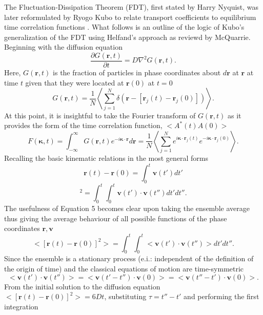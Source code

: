 \documentclass[aps,prb,preprint,preprintnumbers,amsmath,amssymb,floatfix,superscriptaddress]{revtex4}
\begin{document}
The Fluctuation-Dissipation Theorem (FDT), first stated by Harry Nyquist, was later reformulated by Ryogo Kubo to relate transport coefficients to equilibrium time correlation functions \cite{JPSJ.12.570}. What follows is an outline of the logic of Kubo's generalization of the FDT using Helfand's approach as reviewd by McQuarrie\cite{mcquarrie}. Beginning with the diffusion equation
%
\begin{equation}
\frac{\partial G(\pmb{r},t)}{\partial t}= D \nabla ^2G(\pmb{r},t).
\end{equation}
%
Here, $G(\pmb{r},t)$ is the fraction of particles in phase coordinates about $d\pmb{r}$ at $\pmb{r}$ at time $t$ given that they were located at $\pmb{r}(0)$ at $t=0$
%
\begin{equation}
G(\pmb{r},t)= \frac{1}{N}\left<\sum_{j=1}^N\delta(\pmb{r}-[\pmb{r}_j(t)-\pmb{r}_j(0)])\right>.
\end{equation}
%
At this point, it is insightful to take the Fourier transform of $G(\pmb{r},t)$ as it provides the form of the time correlation function, $<A^*(t)A(0)>$
%
\begin{equation}
F(\pmb{\kappa},t)=\int_{-\infty}^{\infty}G(\pmb{r},t)e^{-i\pmb{\kappa}\cdot\pmb{r}}d\pmb{r}=\frac{1}{N}\left<\sum_{j=1}^Ne^{i\pmb{\kappa}\cdot\pmb{r}_j(t)}e^{-i\pmb{\kappa}\cdot\pmb{r}_j(0)}\right>.
\end{equation}
%
Recalling the basic kinematic relations in the most general forms
%
\begin{equation}
\pmb{r}(t)-\pmb{r}(0)=\int_0^t \pmb{v}(t')dt'
\end{equation}
\begin{equation}
[\pmb{r}(t)-\pmb{r}(0)]^2=\int_0^t \int_0^t \pmb{v}(t')\cdot\pmb{v}(t'')dt'dt''.
\end{equation}
%
The usefulness of Equation 5 becomes clear upon taking the ensemble average thus giving the average behaviour of all possible functions of the phase coordinates $\pmb{r},\pmb{v}$
%
\begin{equation}
<[\pmb{r}(t)-\pmb{r}(0)]^2>=\int_0^t \int_0^t <\pmb{v}(t')\cdot\pmb{v}(t'')>dt'dt''.
\end{equation}
%
Since the ensemble is a stationary process (e.i.: independent of the definition of the origin of time) and the classical equations of motion are time-symmetric
%
\begin{equation}
<\pmb{v}(t')\cdot\pmb{v}(t'')>=<\pmb{v}(t'-t'')\cdot\pmb{v}(0)>=<\pmb{v}(t''-t')\cdot\pmb{v}(0)>.
\end{equation}
%
From the initial solution to the diffusion equation $<[\pmb{r}(t)-\pmb{r}(0)]^2>=6Dt$, substituting $\tau=t''-t'$ and performing the first integration
\end{document}
